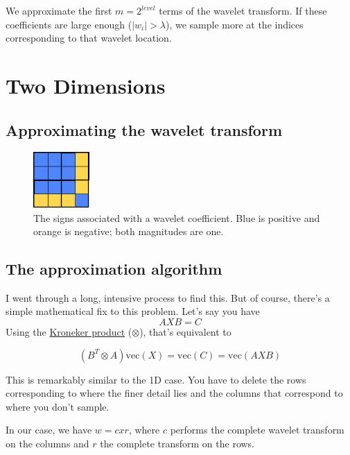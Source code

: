 \documentclass[leqno]{article}
\newcommand{\kron}{http://en.wikipedia.org/wiki/Kronecker\_product\#Matrix\_equations}
\begin{document}
        We approximate the first $m=2^{level}$ terms of the wavelet transform. If these coefficients are large enough ($|w_i|> \lambda$), we sample more at the indices corresponding to that wavelet location.


    \section{Two Dimensions}
        \subsection{Approximating the wavelet transform}
            \begin{figure}
                \begin{center}
                    \includegraphics[width=0.19\textwidth]{signs}
                \end{center}
                \caption{The signs associated with a wavelet coefficient. Blue is positive and orange is negative; both magnitudes are one.  }
                \label{fig:signs}    
            \end{figure}

        \subsection{The approximation algorithm}
            I went through a long, intensive process to find this. But of course, there's a simple mathematical fix to this problem. Let's say you have 
                $$AXB = C$$
                Using the \href{\kron}{Kroneker product} ($\otimes$), that's equivalent to

                $$(B^T \otimes A)\text{vec}(X) = \text{vec}(C) = \text{vec}(AXB) $$

                This is remarkably similar to the 1D case. You have to delete the rows corresponding to where the finer detail lies and the columns that correspond to where you don't sample.

                In our case, we have $w = c x r$, where $c$ performs the complete wavelet transform on the columns and $r$ the complete transform on the rows. 
\end{document}
